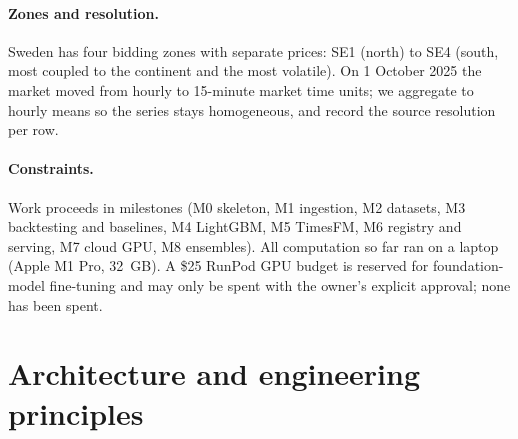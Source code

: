 \documentclass[11pt,a4paper]{article}
\begin{document}
\paragraph{Zones and resolution.}
Sweden has four bidding zones with separate prices: SE1 (north) to SE4 (south, most coupled to the
continent and the most volatile). On 1 October 2025 the market moved from hourly to 15-minute
market time units; we aggregate to hourly means so the series stays homogeneous, and record the
source resolution per row.

\paragraph{Constraints.}
Work proceeds in milestones (M0 skeleton, M1 ingestion, M2 datasets, M3 backtesting and baselines,
M4 LightGBM, M5 TimesFM, M6 registry and serving, M7 cloud GPU, M8 ensembles). All computation
so far ran on a laptop (Apple M1 Pro, 32~GB). A \$25 RunPod GPU budget is reserved for
foundation-model fine-tuning and may only be spent with the owner's explicit approval; none has
been spent.

\section{Architecture and engineering principles}
\end{document}
